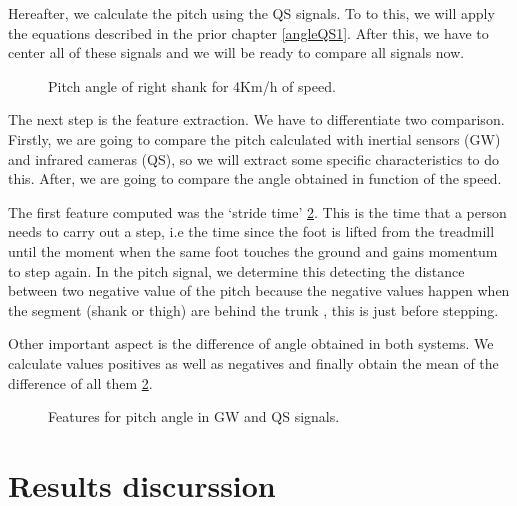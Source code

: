 Hereafter, we calculate the pitch using the QS signals. To to this, we will apply the equations described in the prior chapter \ref{angleQS1}.
After this, we have to center all of these signals and we will be ready to compare all signals now.

\begin{figure}[H]
	\centering
	\caption{Pitch angle of right shank for 4Km/h of speed.}
	\label{fig:signalGWQS}
\end{figure}

The next step is the feature extraction. We have to differentiate two comparison. Firstly, we are going to compare the pitch calculated with inertial sensors (GW) and infrared cameras (QS), so we will extract some specific characteristics to do this. After, we are going to compare the angle obtained in function of the speed.

The first feature computed was the ‘stride time’ \ref{fig:featuresGWQS}. This is the time that a person needs to carry out a step, i.e the time since the foot is lifted from the treadmill until the moment when the same foot touches the ground and gains momentum to step again. In the pitch signal, we determine this detecting the distance between two negative value of the pitch because the negative values happen when the segment (shank or thigh) are behind the trunk , this is just before stepping.

Other important aspect is the difference of angle obtained in both systems. We calculate values positives as well as negatives and finally obtain the mean of the difference of all them \ref{fig:featuresGWQS}.
\begin{figure}[H]
	\centering
	\caption{Features for pitch angle in GW and QS signals.}
	\label{fig:featuresGWQS}
\end{figure}

\section{Results discurssion}

